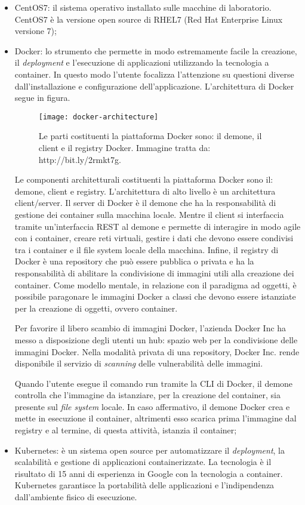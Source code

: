 \begin{itemize}
	\item CentOS7: il sistema operativo installato sulle macchine di 
		  laboratorio. CentOS7 è la versione open source di RHEL7 (Red Hat Enterprise 
		  Linux versione 7);
	\item Docker: lo strumento che permette in modo estremamente facile la 
		  creazione, il \textit{deployment} e l'esecuzione di applicazioni utilizzando la 
		  tecnologia a container. In questo modo l'utente focalizza l'attenzione su 
		  questioni diverse dall'installazione e configurazione dell'applicazione. 
		  L'architettura di Docker segue in figura. 
	
	\begin{figure}[htbp]
		\begin{center}
			\texttt{[image: docker-architecture]}
			\caption{Le parti costituenti la piattaforma Docker 
					 sono: il demone, il client e il registry 
					 Docker. Immagine tratta da: http://bit.ly/2rmkt7g.}
		\end{center}
	\end{figure}
	
Le componenti architetturali costituenti la piattaforma Docker sono il:
demone, client e registry. L'architettura di alto livello è 
un architettura client/server. Il server di Docker è il demone che ha 
la responsabilità di gestione dei container sulla macchina locale. Mentre il 
client si interfaccia tramite un'interfaccia REST al demone e permette di 
interagire in modo agile con i container, creare reti virtuali, gestire i dati 
che devono essere condivisi tra i container e il file system locale della 
macchina. Infine, il registry di Docker è una repository che può essere 
pubblica o privata e ha la responsabilità di abilitare la condivisione di 
immagini utili alla creazione dei container. Come modello mentale, in relazione 
con il paradigma ad oggetti, è possibile paragonare le immagini Docker a classi 
che devono essere istanziate per la creazione di oggetti, ovvero container. 
	
Per favorire il libero scambio di immagini Docker, l'azienda Docker Inc 
ha messo a disposizione degli utenti un hub: spazio web per la condivisione 
delle immagini Docker. Nella modalità privata di una repository, Docker Inc. 
rende disponibile il servizio di \textit{scanning} delle vulnerabilità 
delle immagini. 
	
Quando l'utente esegue il comando run tramite la CLI di Docker, il 
demone controlla che l'immagine da istanziare, per la creazione del 
container, sia presente sul \textit{file system} locale. In caso affermativo, 
il demone Docker crea e mette in esecuzione il container, altrimenti esso 
scarica prima l'immagine dal registry e al termine, di questa attività, 
istanzia il container;
\item Kubernetes: è un sistema open source per automatizzare il \textit{deployment}, 
      la scalabilità e gestione di applicazioni containerizzate. 
La tecnologia è il 
	risultato di 15 anni di esperienza in Google con la tecnologia a 
container. 
	Kubernetes garantisce la portabilità delle applicazioni e 
l'indipendenza dall'ambiente fisico di esecuzione.
	

\end{itemize}
